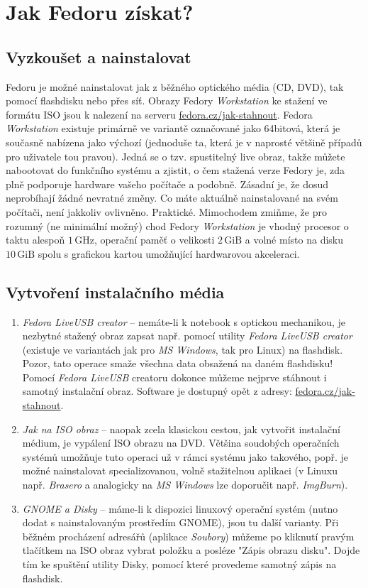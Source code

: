 \chapter*{Jak Fedoru získat?}

\section*{Vyzkoušet a nainstalovat}
Fedoru je možné nainstalovat jak z běžného optického média (CD, DVD), tak pomocí flashdisku nebo přes síť. Obrazy Fedory \emph{Workstation} ke stažení ve formátu ISO jsou k nalezení na serveru \url{fedora.cz/jak-stahnout}. Fedora \emph{Workstation} existuje primárně ve variantě označované jako 64bitová, která je současně nabízena jako výchozí (jednoduše ta, která je v naprosté většině případů pro uživatele tou pravou). Jedná se o tzv. spustitelný live obraz, takže můžete nabootovat do funkčního systému a zjistit, o čem stažená verze Fedory je, zda plně podporuje hardware vašeho počítače a podobně. Zásadní je, že dosud neprobíhají žádné nevratné změny. Co máte aktuálně nainstalované na svém počítači, není jakkoliv ovlivněno. Praktické. Mimochodem zmiňme, že pro rozumný (ne minimální možný) chod Fedory \emph{Workstation} je vhodný procesor o taktu alespoň $1\,\mathrm{GHz}$, operační paměť o velikosti $2\,\mathrm{GiB}$ a volné místo na disku $10\,\mathrm{GiB}$ spolu s grafickou kartou umožňující hardwarovou akceleraci.

\section*{Vytvoření instalačního média}
\begin{enumerate}

\item\emph{Fedora LiveUSB creator} -- nemáte-li k notebook s optickou mechanikou, je nezbytné stažený obraz zapsat např. pomocí utility \emph{Fedora LiveUSB creator} (existuje ve variantách jak pro \emph{MS Windows}, tak pro Linux) na flashdisk. Pozor, tato operace smaže všechna data obsažená na daném flashdisku! Pomocí \emph{Fedora LiveUSB} creatoru dokonce můžeme nejprve stáhnout i samotný instalační obraz. Software je dostupný opět z adresy: \url{fedora.cz/jak-stahnout}.

\item\emph{Jak na ISO obraz} -- naopak zcela klasickou cestou, jak vytvořit instalační médium, je vypálení ISO obrazu na DVD. Většina soudobých operačních systémů umožňuje tuto operaci už v rámci systému jako takového, popř. je možné nainstalovat specializovanou, volně stažitelnou aplikaci (v Linuxu např. \emph{Brasero} a analogicky na \emph{MS Windows} lze doporučit např. \emph{ImgBurn}).

\item\emph{GNOME a Disky} -- máme-li k dispozici linuxový operační systém (nutno dodat s nainstalovaným prostředím GNOME), jsou tu další varianty. Při běžném procházení adresářů (aplikace \emph{Soubory}) můžeme po kliknutí pravým tlačítkem na ISO obraz vybrat položku  a posléze "Zápis obrazu disku". Dojde tím ke spuštění utility Disky, pomocí které provedeme samotný zápis na flashdisk.
\end{enumerate}

